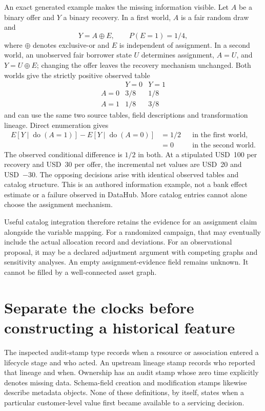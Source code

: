 An exact generated example makes the missing information visible. Let $A$ be
a binary offer and $Y$ a binary recovery. In a first world, $A$ is a fair
random draw and
\[
 Y=A\mathbin{\oplus}E,\qquad P(E=1)=1/4,
\]
where $\oplus$ denotes exclusive-or and $E$ is independent of assignment.
In a second world, an unobserved fair borrower state $U$ determines assignment,
$A=U$, and $Y=U\mathbin{\oplus}E$; changing the offer leaves the recovery
mechanism unchanged. Both worlds give the strictly positive observed table
\[
 \begin{array}{c|cc}
 &Y=0&Y=1\\\hline
 A=0&3/8&1/8\\
 A=1&1/8&3/8
 \end{array}
\]
and can use the same two source tables, field descriptions and transformation
lineage. Direct enumeration gives
\[
 \begin{aligned}
 E[Y\mid\operatorname{do}(A=1)]-E[Y\mid\operatorname{do}(A=0)]
 &=1/2 &&\text{in the first world},\\
 &=0 &&\text{in the second world}.
 \end{aligned}
\]
The observed conditional difference is $1/2$ in both. At a stipulated USD~100
per recovery and USD~30 per offer, the incremental net values are USD~20 and
USD~$-30$. The opposing decisions arise with identical observed tables and
catalog structure. This is an authored information example, not a bank effect
estimate or a failure observed in DataHub. More catalog entries cannot alone
choose the assignment mechanism. \citep{exec16_dh_exact}

Useful catalog integration therefore retains the evidence for an assignment
claim alongside the variable mapping. For a randomized campaign, that may
eventually include the actual allocation record and deviations. For an
observational proposal, it may be a declared adjustment argument with competing
graphs and sensitivity analyses. An empty assignment-evidence field remains
unknown. It cannot be filled by a well-connected asset graph.
\citep{exec16_dh_contract}

\section{Separate the clocks before constructing a historical feature}

The inspected audit-stamp type records when a resource or association entered
a lifecycle stage and who acted. An upstream lineage stamp records who
reported that lineage and when. Ownership has an audit stamp whose zero time
explicitly denotes missing data. Schema-field creation and modification stamps
likewise describe metadata objects. None of these definitions, by itself,
states when a particular customer-level value first became available to a
servicing decision. \citep{exec16_dh_primary}


